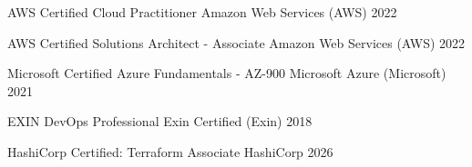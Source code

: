 
\begin{cvhonors}

  \cvhonor
    {AWS Certified Cloud Practitioner} %
    {Amazon Web Services (AWS)} %
    {} %
    {2022} %

  \cvhonor
    {AWS Certified Solutions Architect - Associate} %
    {Amazon Web Services (AWS)} %
    {} %
    {2022} %

  \cvhonor
    {Microsoft Certified Azure Fundamentals - AZ-900} %
    {Microsoft Azure (Microsoft)} %
    {} %
    {2021} %

  \cvhonor
    {EXIN DevOps Professional} %
    {Exin Certified (Exin)} %
    {} %
    {2018} %


  \cvhonor
    {HashiCorp Certified: Terraform Associate} %
    {HashiCorp} %
    {} %
    {2026} %


\end{cvhonors}
